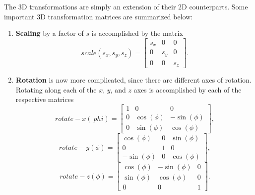 \documentclass[11pt]{article}
\theoremstyle{plain} %
\theoremstyle{definition}
\theoremstyle{example}
\theoremstyle{remark}
\begin{document}
The 3D transformations are simply an extension of their 2D counterparts. Some important 3D transformation matrices are summarized below:
\begin{enumerate}
	\item \textbf{Scaling} by a factor of $s$ is accomplished by the matrix 
	$$scale(s_x, s_y, s_z) = \begin{bmatrix}s_x & 0 & 0 \\ 0 & s_y & 0 \\ 0 & 0 & s_z\end{bmatrix}.$$
	\item \textbf{Rotation} is now more complicated, since there are different axes of rotation. Rotating along each of the $x$, $y$, and $z$ axes is accomplished by each of the respective matrices
	$$rotate-x(\ phi) = \begin{bmatrix}1 & 0 & 0 \\ 0 & \cos(\phi) &-\sin(\phi) \\0 & \sin(\phi) & \cos(\phi) \end{bmatrix},$$
	$$rotate-y(\phi) = \begin{bmatrix}\cos(\phi) &0 &\sin(\phi) \\ 0 & 1 & 0 \\ -\sin(\phi) & 0 & \cos(\phi) \end{bmatrix},$$
	$$rotate-z(\phi) = \begin{bmatrix}\cos(\phi) &-\sin(\phi) & 0 \\ \sin(\phi) & \cos(\phi) & 0 \\ 0 & 0 & 1\end{bmatrix}.$$
	

\end{enumerate}
\end{document}
